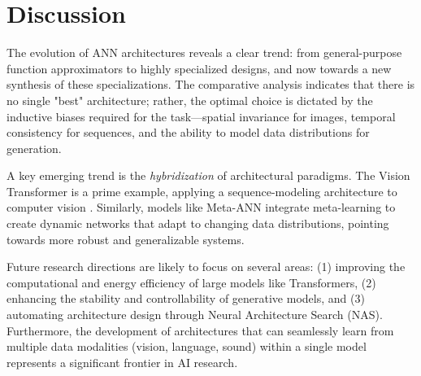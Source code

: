\documentclass[10pt, conference]{IEEEtran}
\begin{document}
\section{Discussion}
\label{sec:discussion}

 The evolution of ANN architectures reveals a clear trend: from
 general-purpose function approximators to highly specialized designs, and
 now towards a new synthesis of these specializations. The comparative
 analysis indicates that there is no single "best" architecture; rather,
 the optimal choice is dictated by the inductive biases required for the
 task—spatial invariance for images, temporal consistency for sequences,
 and the ability to model data distributions for generation.

 A key emerging trend is the \textit{hybridization} of architectural
 paradigms. The Vision Transformer is a prime example, applying
 a sequence-modeling architecture to computer vision
 \cite{dosovitskiy2020image}. Similarly, models like Meta-ANN
 \cite{Xiao2022} integrate meta-learning to create dynamic networks that
 adapt to changing data distributions, pointing towards more robust and
 generalizable systems.

 Future research directions are likely to focus on several areas: (1)
 improving the computational and energy efficiency of large models like
 Transformers, (2) enhancing the stability and controllability of
 generative models, and (3) automating architecture design through Neural
 Architecture Search (NAS). Furthermore, the development of architectures
 that can seamlessly learn from multiple data modalities (vision,
 language, sound) within a single model represents a significant frontier
 in AI research.

\printbibliography
\end{document}
